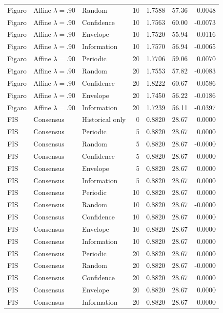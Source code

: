 \begin{longtable}{lllrrrr}
Figaro & Affine $\lambda=.90$ & Random & 10 & 1.7588 & 57.36 & -0.0048 \\
Figaro & Affine $\lambda=.90$ & Confidence & 10 & 1.7563 & 60.00 & -0.0073 \\
Figaro & Affine $\lambda=.90$ & Envelope & 10 & 1.7520 & 55.94 & -0.0116 \\
Figaro & Affine $\lambda=.90$ & Information & 10 & 1.7570 & 56.94 & -0.0065 \\
Figaro & Affine $\lambda=.90$ & Periodic & 20 & 1.7706 & 59.06 & 0.0070 \\
Figaro & Affine $\lambda=.90$ & Random & 20 & 1.7553 & 57.82 & -0.0083 \\
Figaro & Affine $\lambda=.90$ & Confidence & 20 & 1.8222 & 60.67 & 0.0586 \\
Figaro & Affine $\lambda=.90$ & Envelope & 20 & 1.7450 & 56.22 & -0.0186 \\
Figaro & Affine $\lambda=.90$ & Information & 20 & 1.7239 & 56.11 & -0.0397 \\
FIS & Consensus & Historical only & 0 & 0.8820 & 28.67 & 0.0000 \\
FIS & Consensus & Periodic & 5 & 0.8820 & 28.67 & 0.0000 \\
FIS & Consensus & Random & 5 & 0.8820 & 28.67 & -0.0000 \\
FIS & Consensus & Confidence & 5 & 0.8820 & 28.67 & 0.0000 \\
FIS & Consensus & Envelope & 5 & 0.8820 & 28.67 & 0.0000 \\
FIS & Consensus & Information & 5 & 0.8820 & 28.67 & 0.0000 \\
FIS & Consensus & Periodic & 10 & 0.8820 & 28.67 & 0.0000 \\
FIS & Consensus & Random & 10 & 0.8820 & 28.67 & -0.0000 \\
FIS & Consensus & Confidence & 10 & 0.8820 & 28.67 & 0.0000 \\
FIS & Consensus & Envelope & 10 & 0.8820 & 28.67 & 0.0000 \\
FIS & Consensus & Information & 10 & 0.8820 & 28.67 & 0.0000 \\
FIS & Consensus & Periodic & 20 & 0.8820 & 28.67 & 0.0000 \\
FIS & Consensus & Random & 20 & 0.8820 & 28.67 & -0.0000 \\
FIS & Consensus & Confidence & 20 & 0.8820 & 28.67 & 0.0000 \\
FIS & Consensus & Envelope & 20 & 0.8820 & 28.67 & 0.0000 \\
FIS & Consensus & Information & 20 & 0.8820 & 28.67 & 0.0000 \\

\end{longtable}
